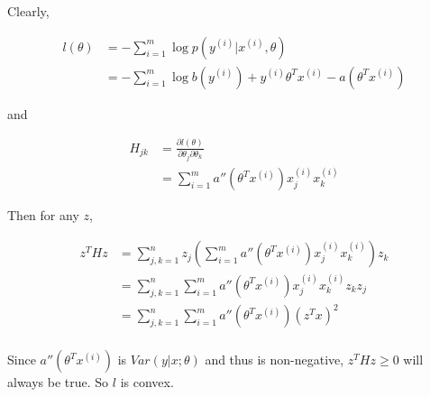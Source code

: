 \begin{answer}
    Clearly,

    $$
\begin{aligned}
l(\theta) &= -\sum_{i=1}^m \log p(y^{(i)}|x^{(i)}, \theta)\\
& = -\sum_{i=1}^m \log b(y^{(i)}) +  y^{(i)}\theta^Tx^{(i)} -  a(\theta^Tx^{(i)})
\end{aligned}
$$

and

$$
\begin{aligned}
H_{jk} &= \frac{\partial l(\theta)}{\partial \theta_j\partial \theta_k} \\
&= \sum_{i=1}^ma''(\theta^Tx^{(i)})x^{(i)}_jx^{(i)}_k
\end{aligned}
$$

Then for any $z$, 

$$
\begin{aligned}
z^THz &= \sum_{j,k=1}^nz_j(\sum_{i=1}^m a''(\theta^Tx^{(i)})x_j^{(i)}x_k^{(i)} )z_k\\
&= \sum_{j,k=1}^n\sum_{i=1}^m a''(\theta^Tx^{(i)})x_j^{(i)}x_k^{(i)} z_kz_j\\
&= \sum_{j,k=1}^n\sum_{i=1}^m a''(\theta^Tx^{(i)})(z^Tx)^2\\
\end{aligned}
$$

    Since $a''(\theta^Tx^{(i)})$ is $Var(y|x;\theta)$ and thus is non-negative, $z^THz\ge 0$ will always be true. So $l$ is convex.
\end{answer}
